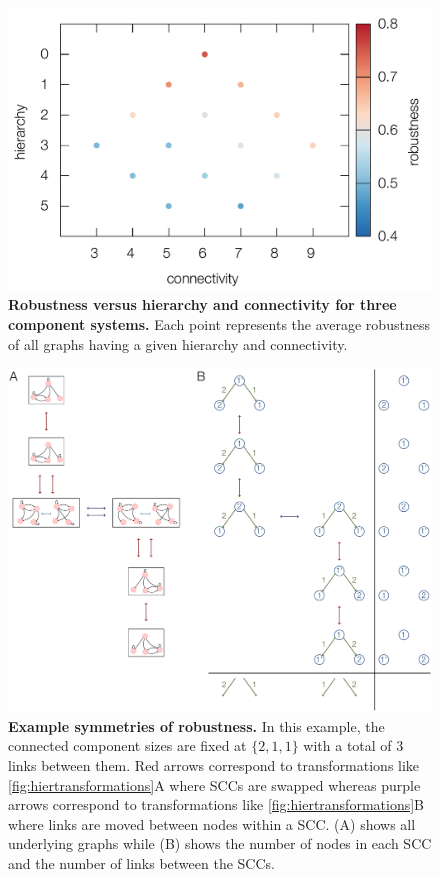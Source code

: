 \pagebreak

\begin{figure}[!ht]
\centering
\noindent\includegraphics[width=0.8\columnwidth]{fig/connectdist3D3x3.pdf}
\caption{{\bf Robustness versus hierarchy and connectivity for three component systems.} Each point represents the average robustness of all graphs having a given hierarchy and connectivity.}
\label{fig:connectdist3D3x3}
\end{figure}

\pagebreak

\begin{figure}[!ht]
\centering
\noindent\includegraphics[width=0.9\columnwidth]{fig/robustnesssymmetries.pdf}
\caption{{\bf Example symmetries of robustness.} In this example, the connected component sizes are fixed at $\{2,1,1\}$ with a total of $3$ links between them. Red arrows correspond to transformations like \ref{fig:hiertransformations}A where SCCs are swapped whereas purple arrows correspond to transformations like \ref{fig:hiertransformations}B where links are moved between nodes within a SCC. (A) shows all underlying graphs while (B) shows the number of nodes in each SCC and the number of links between the SCCs.}
\label{fig:robustnesssymmetries}
\end{figure}
